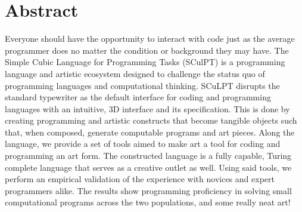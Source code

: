 
\chapter{Abstract}

Everyone should have the opportunity to interact with code just as the average programmer does no matter the condition or background they may have.
The Simple Cubic Language for Programming Tasks (SCulPT) is a programming language and artistic ecosystem designed to challenge the status quo of programming languages and computational thinking.
SCuLPT disrupts the standard typewriter as the default interface for coding and programming languages with an intuitive, 3D interface and its specification.
This is done by creating programming and artistic constructs that become tangible objects such that, when composed, generate computable programs and art pieces.
Along the language, we provide a set of tools aimed to make art a tool for coding and programming an art form.
The constructed language is a fully capable, Turing complete language that serves as a creative outlet as well.
Using said tools, we perform an empirical validation of the experience with novices and expert programmers alike.
The results show programming proficiency in solving small computational programs across the two populations, and some really neat art!

\endinput

